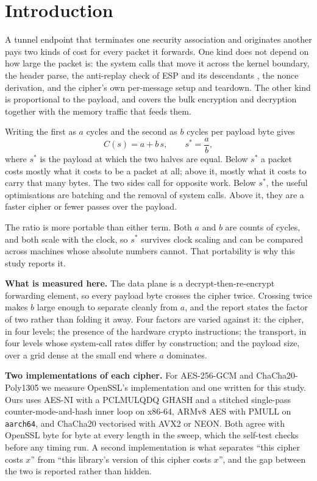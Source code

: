 \section{Introduction}

A tunnel endpoint that terminates one security association and originates
another pays two kinds of cost for every packet it forwards. One kind does not
depend on how large the packet is: the system calls that move it across the
kernel boundary, the header parse, the anti-replay check of ESP and its
descendants \cite{rfc4303}, the nonce derivation, and the cipher's own
per-message setup and teardown. The other kind is proportional to the payload,
and covers the bulk encryption and decryption together with the memory traffic
that feeds them.

Writing the first as $a$ cycles and the second as $b$ cycles per payload byte
gives
%
\begin{equation}
C(s) = a + b\,s ,
\qquad
s^{*} = \frac{a}{b} ,
\label{eq:model}
\end{equation}
%
where $s^{*}$ is the payload at which the two halves are equal. Below $s^{*}$ a
packet costs mostly what it costs to be a packet at all; above it, mostly what
it costs to carry that many bytes. The two sides call for opposite work. Below
$s^{*}$, the useful optimisations are batching and the removal of system calls.
Above it, they are a faster cipher or fewer passes over the payload.

The ratio is more portable than either term. Both $a$ and $b$ are counts of
cycles, and both scale with the clock, so $s^{*}$ survives clock scaling and can
be compared across machines whose absolute numbers cannot. That portability is
why this study reports it.

\noindent\textbf{What is measured here.}
The data plane is a decrypt-then-re-encrypt forwarding element, so every payload
byte crosses the cipher twice. Crossing twice makes $b$ large enough to separate
cleanly from $a$, and the report states the factor of two rather than folding it
away. Four factors are varied against it: the cipher, in four levels; the
presence of the hardware crypto instructions; the transport, in four levels
whose system-call rates differ by construction; and the payload size, over a
grid dense at the small end where $a$ dominates.

\noindent\textbf{Two implementations of each cipher.}
For AES-256-GCM \cite{nistgcm} and ChaCha20-Poly1305 \cite{rfc8439} we measure
OpenSSL's implementation and one written for this study. Ours uses AES-NI with a
PCLMULQDQ GHASH \cite{gueron2010} and a stitched single-pass
counter-mode-and-hash inner loop \cite{krasnov2017} on x86-64, ARMv8 AES with
PMULL on \texttt{aarch64}, and ChaCha20 vectorised with AVX2 or NEON. Both agree
with OpenSSL byte for byte at every length in the sweep, which the self-test
checks before any timing run. A second implementation is what separates ``this
cipher costs $x$'' from ``this library's version of this cipher costs $x$'', and
the gap between the two is reported rather than hidden.


